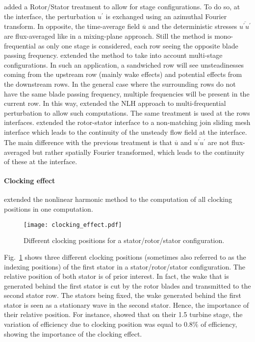 \citet{Chen2001} added a Rotor/Stator treatment
to allow for stage configurations. 
To do so, at the interface, the perturbation 
$u^\prime$ is exchanged using
an azimuthal Fourier transform. In opposite,
the time-average field $\overline{u}$ 
and the deterministic stresses 
$\overline{u^\prime u^\prime}$
are flux-averaged like in a mixing-plane approach.
Still the method is mono-frequential as only
one stage is considered, each row seeing the
opposite blade passing frequency.
\citet{He2002} extended the method to take into
account multi-stage configurations. 
In such an application, 
a sandwiched row will see unsteadinesses coming
from the upstream row (mainly wake effects) and
potential effects from the downstream rows. In the
general case where the surrounding rows do not have the
same blade passing frequency, multiple frequencies
will be present in the current row. 
In this way, \citet{He2002} extended the NLH approach to
multi-frequential perturbation to allow such computations.
The same treatment is used at the rows interfaces.
\citet{Vilmin2006} extended the rotor-stator
interface to a non-matching join sliding mesh interface which
leads to the continuity of the unsteady flow field at the interface.
The main difference with the previous treatment is that
$\overline{u}$ and $\overline{u^\prime u^\prime}$ 
are not flux-averaged but rather spatially Fourier transformed,
which leads to the continuity of these at the interface.

\paragraph{Clocking effect}
\citet{He2002} extended the nonlinear harmonic method to
the computation of all clocking positions in one computation.
\begin{figure}[htbp]
  \centering 
  \texttt{[image: clocking\_effect.pdf]}
  \caption{Different clocking positions for a stator/rotor/stator
  configuration.}
  \label{fig:sm_nlh_clocking_effect}
\end{figure}
Fig.~\ref{fig:sm_nlh_clocking_effect} shows three
different clocking positions (sometimes also referred 
to as the indexing positions)
of the first stator
in a stator/rotor/stator configuration.
The relative position of both stator is of
prior interest. In fact, the wake that is generated behind the first stator
is cut by the rotor blades and transmitted to 
the second stator row. The stators being fixed, the wake generated
behind the first stator is seen as a stationary wave in the second stator.
Hence, the importance of their relative position. For instance,
\citet{Huber1996} showed that
on their 1.5 turbine stage, the variation of efficiency due to clocking
position was equal to $0.8\%$ of efficiency, showing the
importance of the clocking effect.


